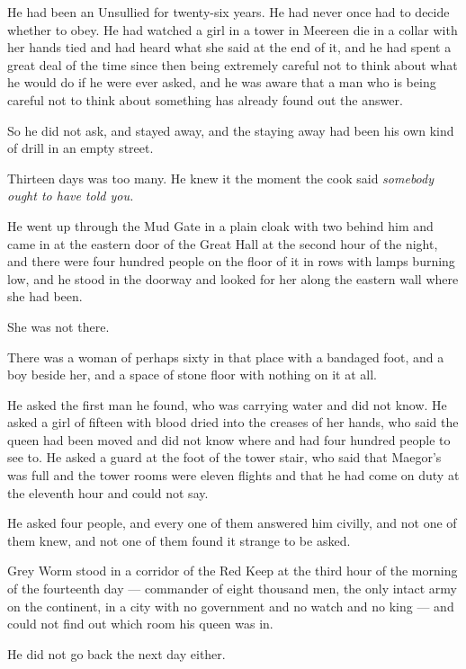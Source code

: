 He had been an Unsullied for twenty-six years. He had never once had to decide whether to obey. He had watched a girl in a tower in Meereen die in a collar with her hands tied and had heard what she said at the end of it, and he had spent a great deal of the time since then being extremely careful not to think about what he would do if he were ever asked, and he was aware that a man who is being careful not to think about something has already found out the answer.

So he did not ask, and stayed away, and the staying away had been his own kind of drill in an empty street.

Thirteen days was too many. He knew it the moment the cook said \textit{somebody ought to have told you.}

He went up through the Mud Gate in a plain cloak with two behind him and came in at the eastern door of the Great Hall at the second hour of the night, and there were four hundred people on the floor of it in rows with lamps burning low, and he stood in the doorway and looked for her along the eastern wall where she had been.

She was not there.

There was a woman of perhaps sixty in that place with a bandaged foot, and a boy beside her, and a space of stone floor with nothing on it at all.

He asked the first man he found, who was carrying water and did not know. He asked a girl of fifteen with blood dried into the creases of her hands, who said the queen had been moved and did not know where and had four hundred people to see to. He asked a guard at the foot of the tower stair, who said that Maegor’s was full and the tower rooms were eleven flights and that he had come on duty at the eleventh hour and could not say.

He asked four people, and every one of them answered him civilly, and not one of them knew, and not one of them found it strange to be asked.

Grey Worm stood in a corridor of the Red Keep at the third hour of the morning of the fourteenth day — commander of eight thousand men, the only intact army on the continent, in a city with no government and no watch and no king — and could not find out which room his queen was in.

He did not go back the next day either.